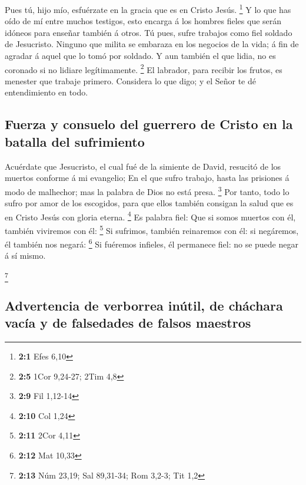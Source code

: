  Pues tú, hijo mío, esfuérzate en la gracia que es en
Cristo Jesús. \footnote{\textbf{2:1} Efes 6,10}  Y lo que
has oído de mí entre muchos testigos, esto encarga á los hombres fieles
que serán idóneos para enseñar también á otros.  Tú pues,
sufre trabajos como fiel soldado de Jesucristo.  Ninguno
que milita se embaraza en los negocios de la vida; á fin de agradar á
aquel que lo tomó por soldado.  Y aun también el que
lidia, no es coronado si no lidiare legítimamente. \footnote{\textbf{2:5}
  1Cor 9,24-27; 2Tim 4,8}  El labrador, para recibir los
frutos, es menester que trabaje primero.  Considera lo que
digo; y el Señor te dé entendimiento en todo.

\hypertarget{fuerza-y-consuelo-del-guerrero-de-cristo-en-la-batalla-del-sufrimiento}{%
\subsection{Fuerza y \hspace{0pt}\hspace{0pt}consuelo del guerrero de
Cristo en la batalla del
sufrimiento}\label{fuerza-y-consuelo-del-guerrero-de-cristo-en-la-batalla-del-sufrimiento}}

 Acuérdate que Jesucristo, el cual fué de la simiente de
David, resucitó de los muertos conforme á mi evangelio; 
En el que sufro trabajo, hasta las prisiones á modo de malhechor; mas la
palabra de Dios no está presa. \footnote{\textbf{2:9} Fil 1,12-14}
 Por tanto, todo lo sufro por amor de los escogidos, para
que ellos también consigan la salud que es en Cristo Jesús con gloria
eterna. \footnote{\textbf{2:10} Col 1,24}  Es palabra
fiel: Que si somos muertos con él, también viviremos con él: \footnote{\textbf{2:11}
  2Cor 4,11}  Si sufrimos, también reinaremos con él: si
negáremos, él también nos negará: \footnote{\textbf{2:12} Mat 10,33}
 Si fuéremos infieles, él permanece fiel: no se puede
negar á sí mismo.

\footnote{\textbf{2:13} Núm 23,19; Sal 89,31-34; Rom 3,2-3; Tit 1,2}

\hypertarget{advertencia-de-verborrea-inuxfatil-de-chuxe1chara-vacuxeda-y-de-falsedades-de-falsos-maestros}{%
\subsection{Advertencia de verborrea inútil, de cháchara vacía y de
falsedades de falsos
maestros}\label{advertencia-de-verborrea-inuxfatil-de-chuxe1chara-vacuxeda-y-de-falsedades-de-falsos-maestros}}


